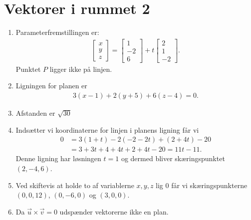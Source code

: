 \section{Vektorer i rummet 2}
\begin{enumerate}
	\item Parameterfremstillingen er:
	\begin{align*}
	\begin{bmatrix}
	x\\y\\z
	\end{bmatrix}=\begin{bmatrix}
	1\\-2\\6
	\end{bmatrix}+t \begin{bmatrix}
	2\\1\\-2
	\end{bmatrix}.
	\end{align*}
	Punktet $P$ ligger ikke på linjen.
	
	\item Ligningen for planen er
	\begin{align*}
	3(x-1)+2(y+5)+6(z-4)=0.
	\end{align*}
	
	\item Afstanden er $\sqrt{30}$
	
	\item Indsætter vi koordinaterne for linjen i planens ligning får vi
	\begin{align*}
	0&=3(1+t)-2(-2-2t)+(2+4t)-20\\&=3+3t+4+4t+2+4t-20=11t-11.
	\end{align*}
	Denne ligning har løsningen $t=1$ og dermed bliver skæringspunktet $(2,-4,6)$.
	
	\item Ved skiftevis at holde to af variablerne $x,y,z$ lig $0$ får vi skæringspunkterne $(0,0,12)$, $(0,-6,0)$ og $(3,0,0)$.

	
	\item Da $\vec{u}\times \vec{v}=0$ udspænder vektorerne ikke en plan.
	

\end{enumerate}

